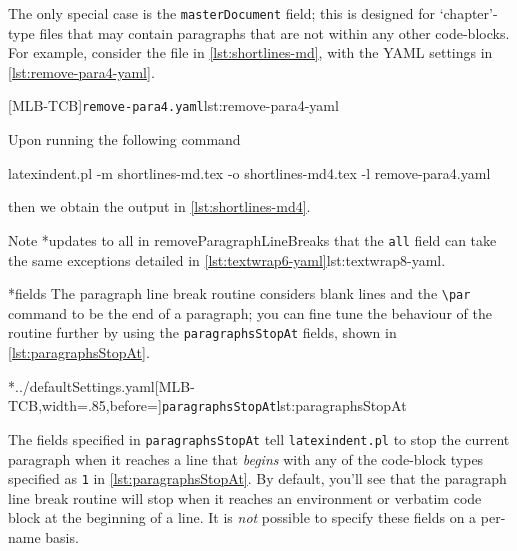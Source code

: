 	The only special case is the \texttt{masterDocument} field; this is designed for
	`chapter'-type files that may contain paragraphs that are not within any other
	code-blocks. For example, consider the file in \cref{lst:shortlines-md}, with the YAML
	settings in \cref{lst:remove-para4-yaml}.

	\begin{cmhtcbraster}
		[MLB-TCB]{\texttt{remove-para4.yaml}}{lst:remove-para4-yaml}
	\end{cmhtcbraster}

	Upon running the following command
	\begin{widepage}
		\begin{commandshell}
latexindent.pl -m shortlines-md.tex -o shortlines-md4.tex -l remove-para4.yaml
\end{commandshell}
	\end{widepage}
	then we obtain the output in \cref{lst:shortlines-md4}. 

	Note%
	*{updates to all in removeParagraphLineBreaks} that the
	\texttt{all} field can take the same exceptions detailed in
	\cref{lst:textwrap6-yaml}{lst:textwrap8-yaml}.

*{fields}
	The paragraph line break routine considers blank lines and the
	\lstinline|\par| command to be the end of a paragraph;
	 you can fine tune the behaviour of the routine further by
	using the \texttt{paragraphsStopAt} fields, shown in \cref{lst:paragraphsStopAt}.

	\cmhlistingsfromfile[style=paragraphsStopAt]*{../defaultSettings.yaml}[MLB-TCB,width=.85\linewidth,before=\centering]{\texttt{paragraphsStopAt}}{lst:paragraphsStopAt}

	The fields specified in \texttt{paragraphsStopAt} tell \texttt{latexindent.pl} to
	stop the current paragraph when it reaches a line that \emph{begins} with
	any of the code-block types specified as \texttt{1} in
	\cref{lst:paragraphsStopAt}. By default, you'll see that the paragraph line break routine
	will stop when it reaches an environment or verbatim code block at the beginning of a
	line. It is \emph{not} possible to specify these fields on a per-name
	basis.

